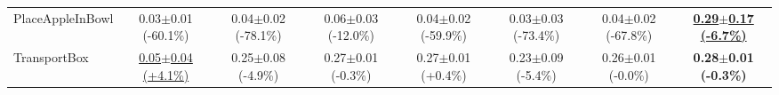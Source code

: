 \begin{table}[htbp]
\begin{adjustbox}{max width=\textwidth}
\begin{tabular}{l*{7}{c}}
PlaceAppleInBowl & 0.03$\pm$0.01 \scriptsize{(-60.1\%)} & 0.04$\pm$0.02 \scriptsize{(-78.1\%)} & 0.06$\pm$0.03 \scriptsize{(-12.0\%)} & 0.04$\pm$0.02 \scriptsize{(-59.9\%)} & 0.03$\pm$0.03 \scriptsize{(-73.4\%)} & 0.04$\pm$0.02 \scriptsize{(-67.8\%)} & \textbf{\underline{0.29$\pm$0.17 \scriptsize{(-6.7\%)}}} \\
TransportBox & \underline{0.05$\pm$0.04 \scriptsize{(+4.1\%)}} & 0.25$\pm$0.08 \scriptsize{(-4.9\%)} & 0.27$\pm$0.01 \scriptsize{(-0.3\%)} & 0.27$\pm$0.01 \scriptsize{(+0.4\%)} & 0.23$\pm$0.09 \scriptsize{(-5.4\%)} & 0.26$\pm$0.01 \scriptsize{(-0.0\%)} & \textbf{0.28$\pm$0.01 \scriptsize{(-0.3\%)}} \\
\bottomrule
\end{tabular}
\end{adjustbox}
\end{table}

